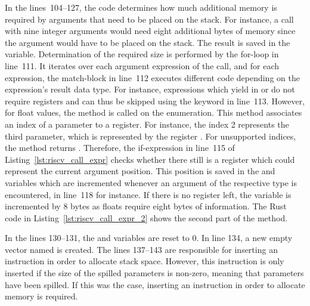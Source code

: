 In the lines~104--127, the code determines how much additional memory is required by arguments that need to be placed on the stack.
For instance, a call with nine integer arguments would need eight additional bytes of memory since the  argument would have to be placed on the stack.
The result is saved in the  variable.
Determination of the required size is performed by the for-loop in line~111.
It iterates over each argument expression of the call, and for each expression, the match-block in line~112 executes different code depending on the expression's result data type.
For instance, expressions which yield in \qVerb{()} or \qVerb{!} do not require registers and can thus be skipped using the  keyword in line~113.
However, for float values, the  method is called on the  enumeration.
This method associates an index of a parameter to a register.
For instance, the index 2 represents the third parameter, which is represented by the register .
For unsupported indices, the method returns .
Therefore, the if-expression in line~115 of Listing~\ref{lst:riscv_call_expr} checks whether there still is a register which could represent the current argument position.
This position is saved in the  and  variables which are incremented whenever an argument of the respective type is encountered, in line~118 for instance.
If there is no register left, the  variable is incremented by 8 bytes as floats require eight bytes of information.
The Rust code in Listing~\ref{lst:riscv_call_expr_2} shows the second part of the method.


In the lines 130--131, the  and  variables are reset to 0.
In line 134, a new empty vector named  is created.
The lines 137--143 are responsible for inserting an  instruction in order to allocate stack space.
However, this instruction is only inserted if the size of the spilled parameters is non-zero,
meaning that parameters have been spilled.
If this was the case, inserting an instruction in order to allocate memory is required.

